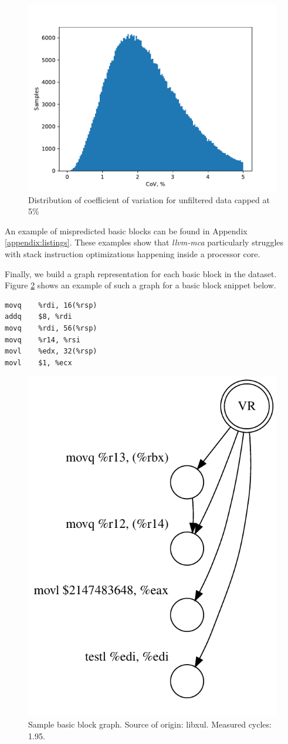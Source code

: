 \begin{figure}[h]
  \centering
  \includegraphics[width=0.9\columnwidth]{cov_distribution_zoom}
  \caption{Distribution of coefficient of variation for unfiltered data capped at 5\%}
  \label{fig:cov}
\end{figure}

An example of mispredicted basic blocks can be found in Appendix \ref{appendix:listings}.
These examples show that \textit{llvm-mca} particularly struggles with stack instruction
optimizations happening inside a processor core.

Finally, we build a graph representation for each basic block in the dataset. 
Figure \ref{fig:sample_graph} shows an example of such a graph for a basic block snippet below.

\begin{lstlisting}[title={Source of the sample basic block}]
movq	%rdi, 16(%rsp)
addq	$8, %rdi
movq	%rdi, 56(%rsp)
movq	%r14, %rsi
movl	%edx, 32(%rsp)
movl	$1, %ecx
\end{lstlisting}

\begin{figure}[h]
  \centering
  \includegraphics[width=0.4\columnwidth]{sample_graph}
  \caption{Sample basic block graph. Source of origin: libxul. Measured cycles: 1.95.}
  \label{fig:sample_graph}
\end{figure}


